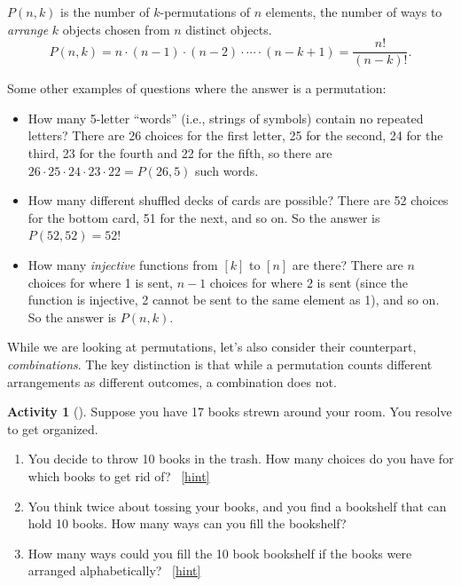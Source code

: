 \documentclass[10pt,]{book}
\theoremstyle{plain}
\theoremstyle{definition}
\theoremstyle{definition}
\theoremstyle{definition}
\newtheorem{activity}[project]{Activity}
\numberwithin{equation}{chapter}
\begin{document}
\begin{assemblage}\label{assemblage-permutation}
\hypertarget{p-655}{}%
\(P(n,k)\) is the number of \(k\)-permutations of \(n\) elements, the number of ways to \emph{arrange} \(k\) objects chosen from \(n\) distinct objects.%
\begin{equation*}
P(n,k) = n\cdot (n-1) \cdot (n-2) \cdot \cdots \cdot (n-k+1) = \frac{n!}{(n-k)!}.
\end{equation*}
%
\end{assemblage}
\hypertarget{p-656}{}%
Some other examples of questions where the answer is a permutation: \leavevmode%
\begin{itemize}[label=\textbullet]
\item{}\hypertarget{p-657}{}%
How many 5-letter ``words'' (i.e., strings of symbols) contain no repeated letters?  There are 26 choices for the first letter, 25 for the second, 24 for the third, 23 for the fourth and 22 for the fifth, so there are \(26\cdot 25 \cdot 24 \cdot 23 \cdot 22 = P(26,5)\) such words.%
\item{}\hypertarget{p-658}{}%
How many different shuffled decks of cards are possible?  There are 52 choices for the bottom card, 51 for the next, and so on.  So the answer is \(P(52,52) = 52!\)%
\item{}\hypertarget{p-659}{}%
How many \emph{injective} functions from \([k]\) to \([n]\) are there?  There are \(n\) choices for where 1 is sent, \(n-1\) choices for where \(2\) is sent (since the function is injective, 2 cannot be sent to the same element as 1), and so on.  So the answer is \(P(n,k)\).%
\end{itemize}
%
\par
\hypertarget{p-660}{}%
While we are looking at permutations, let's also consider their counterpart, \emph{combinations}. The key distinction is that while a permutation counts different arrangements as different outcomes, a combination does not.%
\begin{activity}[]\label{activity-84}
\hypertarget{p-661}{}%
Suppose you have 17 books strewn around your room.  You resolve to get organized.%
\begin{enumerate}[font=\bfseries,label=(\alph*),ref=\alph*]
\item\label{task-135} \hypertarget{p-662}{}%
You decide to throw 10 books in the trash.  How many choices do you have for which books to get rid of?%
~\hfill{\tiny\hyperlink{a-91.a}{[hint]}\hypertarget{q-91.a}{}}\item\label{task-136} \hypertarget{p-664}{}%
You think twice about tossing your books, and you find a bookshelf that can hold 10 books.  How many ways can you fill the bookshelf?%
\item\label{task-137} \hypertarget{p-665}{}%
How many ways could you fill the 10 book bookshelf if the books were arranged alphabetically?%
~\hfill{\tiny\hyperlink{a-91.c}{[hint]}\hypertarget{q-91.c}{}}\end{enumerate}
\end{activity}
\end{document}
